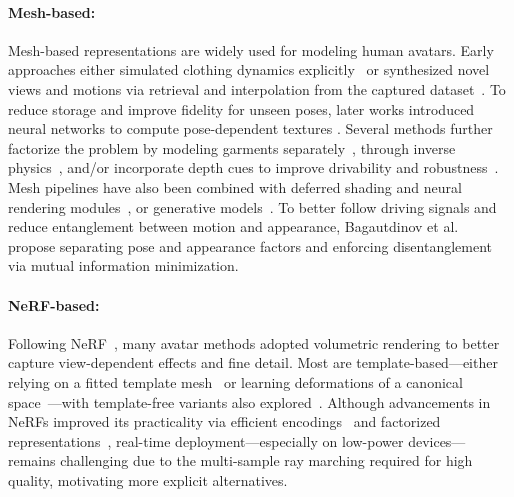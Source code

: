 \documentclass[runningheads]{llncs}
\begin{document}
\paragraph{Mesh-based:}

Mesh-based representations are widely used for modeling human avatars.
Early approaches either simulated clothing dynamics explicitly~\cite{guan2012drape} or synthesized novel views and motions via retrieval and interpolation from the captured dataset~\cite{xu2011videobased,casas20144dvideotextures}.
To reduce storage and improve fidelity for unseen poses, later works introduced neural networks to compute pose-dependent textures \cite{habermann2021real}.
Several methods further factorize the problem by modeling garments separately~\cite{xiang2021modelingclothing,xiang2022dressing}, through inverse physics~\cite{zheng2024physavatar}, and/or incorporate depth cues to improve drivability and robustness~\cite{xiang2023drivable}.
Mesh pipelines have also been combined with deferred shading and neural rendering modules~\cite{ma2021pixel}, or generative models~\cite{zhang2023getavatar}.
To better follow driving signals and reduce entanglement between motion and appearance, Bagautdinov et al.~\cite{bagautdinov2021drivingsignal} propose separating pose and appearance factors and enforcing disentanglement via mutual information minimization.

\paragraph{NeRF-based:}

Following NeRF~\cite{mildenhall2020nerf}, many avatar methods adopted volumetric rendering to better capture view-dependent effects and fine detail.
Most are template-based---either relying on a fitted template mesh~\cite{habermann2021real} or learning deformations of a canonical space~\cite{liu2021neuralactor,xu2021hnerf,peng2021animatablenerf,zheng2023avatarrex}---with template-free variants also explored~\cite{li2022tava}.
Although advancements in NeRFs improved its practicality via efficient encodings~\cite{muller2022instantngp} and factorized representations~\cite{chen2022tensorf}, real-time deployment---especially on low-power devices---remains challenging due to the multi-sample ray marching required for high quality, motivating more explicit alternatives.
\end{document}
